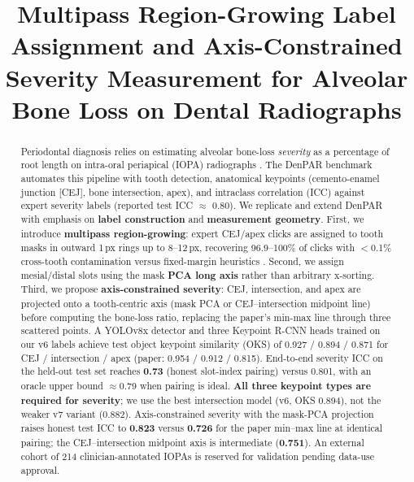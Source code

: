 \documentclass[conference]{IEEEtran}
\title{Multipass Region-Growing Label Assignment and Axis-Constrained\\
Severity Measurement for Alveolar Bone Loss on Dental Radiographs}
\author{
\IEEEauthorblockN{Oralvis SeekRight Research Group}
\IEEEauthorblockA{Department of Computer Science / Dental Informatics\\
Email: \placeholder{author emails}}
}
\begin{document}
\maketitle

\begin{abstract}
Periodontal diagnosis relies on estimating alveolar bone-loss \emph{severity} as a percentage of root length on intra-oral periapical (IOPA) radiographs \cite{armitage2004periodontal_radiography,papageorgiou2021periodontal}. The DenPAR benchmark \cite{denpar2026} automates this pipeline with tooth detection, anatomical keypoints (cemento-enamel junction [CEJ], bone intersection, apex), and intraclass correlation (ICC) against expert severity labels (reported test ICC $\approx$ 0.80). We replicate and extend DenPAR with emphasis on \textbf{label construction} and \textbf{measurement geometry}. First, we introduce \textbf{multipass region-growing}: expert CEJ/apex clicks are assigned to tooth masks in outward 1\,px rings up to 8--12\,px, recovering 96.9--100\% of clicks with $<$0.1\% cross-tooth contamination versus fixed-margin heuristics \cite{kassam2020regiongrowing}. Second, we assign mesial/distal slots using the mask \textbf{PCA long axis} \cite{jolliffe2002pca} rather than arbitrary x-sorting. Third, we propose \textbf{axis-constrained severity}: CEJ, intersection, and apex are projected onto a tooth-centric axis (mask PCA or CEJ--intersection midpoint line) before computing the bone-loss ratio, replacing the paper's min-max line through three scattered points. A YOLOv8x detector \cite{jocher2023yolo} and three Keypoint R-CNN heads \cite{he2017mask,ren2015faster} trained on our v6 labels achieve test object keypoint similarity (OKS) of 0.927 / 0.894 / 0.871 for CEJ / intersection / apex (paper: 0.954 / 0.912 / 0.815). End-to-end severity ICC on the held-out test set reaches \textbf{0.73} (honest slot-index pairing) versus 0.801, with an oracle upper bound $\approx$0.79 when pairing is ideal. \textbf{All three keypoint types are required for severity}; we use the best intersection model (v6, OKS 0.894), not the weaker v7 variant (0.882). Axis-constrained severity with the mask-PCA projection raises honest test ICC to \textbf{0.823} versus \textbf{0.726} for the paper min--max line at identical pairing; the CEJ--intersection midpoint axis is intermediate (\textbf{0.751}). An external cohort of 214 clinician-annotated IOPAs is reserved for validation pending data-use approval.
\end{abstract}
\end{document}
